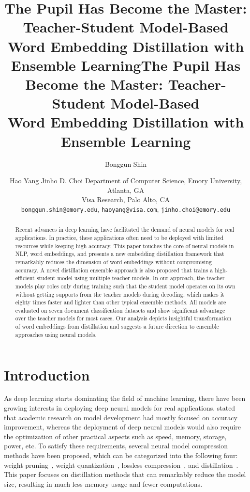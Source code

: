 \documentclass{article}
\title{The Pupil Has Become the Master: Teacher-Student Model-Based\\Word Embedding Distillation with Ensemble Learning}
\author{
Bonggun Shin
\and
Hao Yang\And
Jinho D. Choi
\affiliations
Department of Computer Science, Emory University, Atlanta, GA\\
Visa Research, Palo Alto, CA\\
\emails
\texttt{bonggun.shin@emory.edu},
\texttt{haoyang@visa.com},
\texttt{jinho.choi@emory.edu}
}
\begin{document}
\title{The Pupil Has Become the Master: Teacher-Student Model-Based\\Word Embedding Distillation with Ensemble Learning}





\maketitle

\begin{abstract}
Recent advances in deep learning have facilitated the demand of neural models for real applications.
In practice, these applications often need to be deployed with limited resources while keeping high accuracy.
This paper touches the core of neural models in NLP, word embeddings, and presents a new embedding distillation framework that remarkably reduces the dimension of word embeddings without compromising accuracy.
A novel distillation ensemble approach is also proposed that trains a high-efficient student model using multiple teacher models.
In our approach, the teacher models play roles only during training such that the student model operates on its own without getting supports from the teacher models during decoding, which makes it eighty times faster and lighter than other typical ensemble methods.
All models are evaluated on seven document classification datasets and show significant advantage over the teacher models for most cases.
Our analysis depicts insightful transformation of word embeddings from distillation and suggests a future direction to ensemble approaches using neural models.
\end{abstract} \section{Introduction}
As deep learning starts dominating the field of machine learning, there have been growing interests in deploying deep neural models for real applications.
\cite{hinton2015distilling} stated that academic research on model development had mostly focused on accuracy improvement, whereas the deployment of deep neural models would also require the optimization of other practical aspects such as speed, memory, storage, power, etc.
To satisfy these requirements, several neural model compression methods have been proposed, which can be categorized into the following four:
weight pruning~\cite{denil2013predicting,han2015learning,jurgovsky2016evaluating}, 
weight quantization~\cite{han2015deep,jurgovsky2016evaluating,ling2016word}, 
lossless compression~\cite{van1976construction,han2015learning}, 
and distillation~\cite{mou2016distilling}.
This paper focuses on distillation methods that can remarkably reduce the model size, resulting in much less memory usage and fewer computations.
\end{document}

